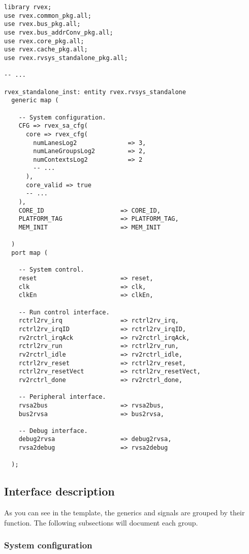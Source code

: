 \begin{lstlisting}[numbers=none]
library rvex;
use rvex.common_pkg.all;
use rvex.bus_pkg.all;
use rvex.bus_addrConv_pkg.all;
use rvex.core_pkg.all;
use rvex.cache_pkg.all;
use rvex.rvsys_standalone_pkg.all;

-- ...

rvex_standalone_inst: entity rvex.rvsys_standalone
  generic map (
    
    -- System configuration.
    CFG => rvex_sa_cfg(
      core => rvex_cfg(
        numLanesLog2              => 3,
        numLaneGroupsLog2         => 2,
        numContextsLog2           => 2
        -- ...
      ),
      core_valid => true
      -- ...
    ),
    CORE_ID                     => CORE_ID,
    PLATFORM_TAG                => PLATFORM_TAG,
    MEM_INIT                    => MEM_INIT
    
  )
  port map (
    
    -- System control.
    reset                       => reset,
    clk                         => clk,
    clkEn                       => clkEn,
    
    -- Run control interface.
    rctrl2rv_irq                => rctrl2rv_irq,
    rctrl2rv_irqID              => rctrl2rv_irqID,
    rv2rctrl_irqAck             => rv2rctrl_irqAck,
    rctrl2rv_run                => rctrl2rv_run,
    rv2rctrl_idle               => rv2rctrl_idle,
    rctrl2rv_reset              => rctrl2rv_reset,
    rctrl2rv_resetVect          => rctrl2rv_resetVect,
    rv2rctrl_done               => rv2rctrl_done,
    
    -- Peripheral interface.
    rvsa2bus                    => rvsa2bus,
    bus2rvsa                    => bus2rvsa,
    
    -- Debug interface.
    debug2rvsa                  => debug2rvsa,
    rvsa2debug                  => rvsa2debug
    
  );

\end{lstlisting}

\subsection{Interface description}
\label{sec:rvsyssa-iface}

As you can see in the template, the generics and signals are grouped by their 
function. The following subsections will document each group.

\subsubsection{System configuration}
\label{sec:rvsyssa-iface-generics}

